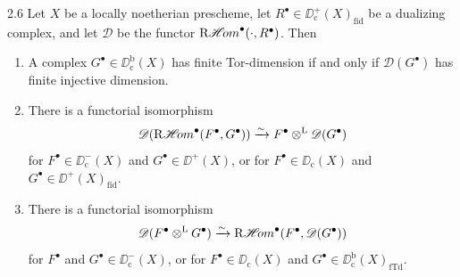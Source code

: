 \begin{bookproposition}{2.6}\label{prop:5.2.6}
Let $X$ be a locally noetherian prescheme, let $R^\bullet\in\DD^+_{\mathrm{c}}(X)_{\mathrm{fid}}$ be a dualizing complex, and let $\mathscr{D}$ be the functor $\mathop{\mathrm{R}\mathscr{H}\!om}\nolimits^\bullet(\cdot,R^\bullet)$. Then
\begin{enumerate}
\item[a)] A complex $G^\bullet\in\DD_{\mathrm{c}}^{\mathrm{b}}(X)$ has finite Tor-dimension  if and only if $\mathscr{D}(G^\bullet)$ has finite injective dimension.
\item[b)] There is a functorial isomorphism
\[
\mathscr{D}(\mathop{\mathrm{R}\mathscr{H}\!om}\nolimits^\bullet(F^\bullet,G^\bullet)) \xrightarrow{\sim} F^\bullet\mathbin{\otimes^{\mathrm{L}}} \mathscr{D}(G^\bullet)
\]
for $F^\bullet\in\DD_{\mathrm{c}}^-(X)$ and $G^\bullet\in\DD^+(X)$, or for $F^\bullet\in\DD_{\mathrm{c}}(X)$ and $G^\bullet\in\DD^+(X)_{\mathrm{fid}}$.
\item[c)] There is a functorial isomorphism
\[
\mathscr{D}(F^{\bullet}\mathbin{\otimes^{\mathrm{L}}} G^{\bullet}) \xrightarrow{\sim} \mathop{\mathrm{R}\mathscr{H}\!om}\nolimits^{\bullet}(F^{\bullet}, \mathscr{D}(G^{\bullet}))
\]
for $F^\bullet$ and $G^\bullet\in\DD_{\mathrm{c}}^-(X)$, or for $F^\bullet\in\DD_{\mathrm{c}}(X)$ and $G^\bullet\in\DD_{\mathrm{c}}^{\mathrm{b}}(X)_{\mathrm{fTd}}$.
\end{enumerate}
\end{bookproposition}

